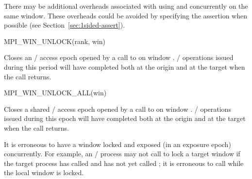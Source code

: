 \begin{users}
There may be additional overheads associated with using
 and  concurrently
on the same window. These overheads could be avoided by specifying the
assertion  when possible (see
Section~\ref{sec:1sided-assert}).
\end{users}

%
\begin{funcdef}{MPI\_WIN\_UNLOCK}{(\mbox{rank}, \mbox{win})}
\end{funcdef}

Closes an \RMA/ access epoch opened by a call to
 on window .
\RMA/ operations issued during this
period will have completed both at the origin and at the target when the call returns.

%
\begin{funcdef}{MPI\_WIN\_UNLOCK\_ALL}{(\mbox{win})}
\end{funcdef}

Closes a shared \RMA/ access epoch opened by a call to
 on window .
\RMA/ operations issued during this
epoch will have completed both at the origin and at the target when the call returns.

\bigskip%

It is erroneous to have a window locked and exposed (in an exposure
epoch) concurrently.  For example, an \mpi/ process may not call
 to lock a target window if the target process
has called  and has not yet called
; it is erroneous to call
 while the local window is locked.

